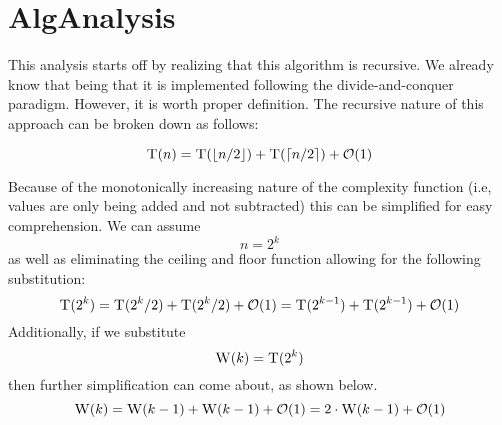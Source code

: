 \documentclass{article}
\DeclarePairedDelimiter\ceil{\lceil}{\rceil}
\DeclarePairedDelimiter\floor{\lfloor}{\rfloor}
\begin{document}
    \section{AlgAnalysis}

    This analysis starts off by realizing that this algorithm is recursive.
    We already know that being that it is implemented following the 
    divide-and-conquer paradigm. However, it is worth proper definition.
    The recursive nature of this approach can be broken down as follows:

    \[ \Call{T}{n} = \Call{T}{\floor{n/2}} + \Call{T}{\ceil{n/2}} + \mathcal{O}(1) \]

    Because of the monotonically increasing nature of the complexity function (i.e, 
    values are only being added and not subtracted) this can be simplified for easy
    comprehension. We can assume
    \[ n = 2^k \]
    as well as eliminating the ceiling and floor function allowing for the following 
    substitution:
    \[ 
        \Call{T}{2^k} = \Call{T}{2^k/2} + \Call{T}{2^k/2} + \mathcal{O}(1) 
                      = \Call{T}{2^{k-1}} + \Call{T}{2^{k-1}} + \mathcal{O}(1)
    \]
    Additionally, if we substitute
    \[ \Call{W}{k} = \Call{T}{2^k} \]
    then further simplification can come about, as shown below.
    \[ 
        \Call{W}{k} = \Call{W}{k - 1} + \Call{W}{k - 1} + \mathcal{O}(1)
                    = 2 \cdot \Call{W}{k - 1} + \mathcal{O}(1)
    \]
\end{document}
